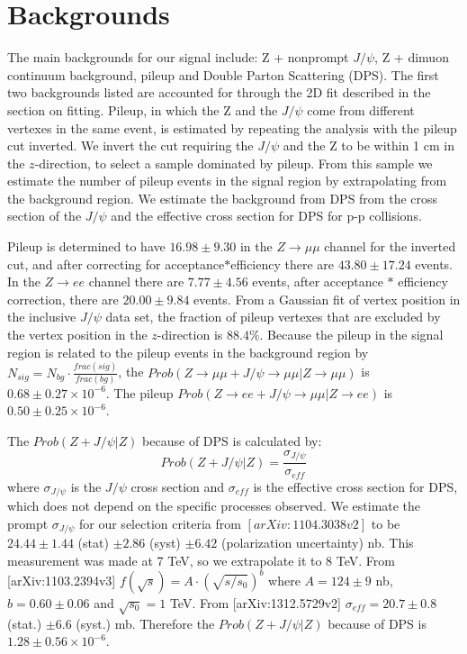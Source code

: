 \documentclass[a4paper,12pt]{article}
\begin{document}
\section{Backgrounds}
The main backgrounds for our signal include: Z + nonprompt $J\slash \psi$, Z + dimuon continuum background, pileup and Double Parton Scattering (DPS). The first two backgrounds listed are accounted for through the 2D fit described in the section on fitting. Pileup, in which the Z and the $J\slash \psi$ come from different vertexes in the same event, is estimated by repeating the analysis with the pileup cut inverted. We invert the cut requiring the $J\slash \psi$ and the Z to be within 1 \unit{cm} in the $z$-direction, to select a sample dominated by pileup. From this sample we estimate the number of pileup events in the signal region by extrapolating from the background region. We estimate the background from DPS from the cross section of the $J\slash \psi$ and the effective cross section for DPS for p-p collisions.

Pileup is determined to have $16.98 \pm 9.30$ in the $Z\rightarrow\mu\mu$ channel for the inverted cut, and after correcting for acceptance$\ast$efficiency there are $43.80 \pm 17.24$ events. In the $Z\rightarrow ee$ channel there are $7.77 \pm 4.56$ events, after acceptance $\ast$ efficiency correction, there are $20.00 \pm 9.84$ events. From a Gaussian fit of vertex position in the inclusive $J\slash \psi$ data set, the fraction of pileup vertexes that are excluded by the vertex position in the $z$-direction is $88.4\%$. Because the pileup in the signal region is related to the pileup events in the background region by $N_{sig} = N_{bg} \cdot \frac{frac(sig)}{frac(bg)}$, the $Prob(Z\rightarrow\mu\mu + J\slash \psi\rightarrow\mu\mu | Z\rightarrow\mu\mu)$ is $0.68 \pm 0.27 \times 10^{-6}$. The pileup $Prob(Z\rightarrow ee + J\slash \psi\rightarrow\mu\mu | Z\rightarrow ee)$ is $0.50 \pm 0.25 \times 10^{-6}$.

The $Prob(Z + J\slash \psi | Z)$ because of DPS is calculated by:
\begin{equation}
Prob(Z+J\slash\psi | Z) = \frac{\sigma_{J\slash\psi}}{\sigma_{eff}}
\end{equation}
where $\sigma_{J\slash\psi}$ is the $J\slash \psi$ cross section and $\sigma_{eff}$ is the effective cross section for DPS, which does not depend on the specific processes observed. We estimate the prompt $\sigma_{J\slash\psi}$ for our selection criteria from $[arXiv:1104.3038v2]$ to be $24.44 \pm 1.44$ (stat) $\pm 2.86$ (syst) $\pm 6.42$ (polarization uncertainty) \unit{nb}. This measurement was made at 7 \unit{TeV}, so we extrapolate it to 8 \unit{TeV}. From [arXiv:1103.2394v3] $f(\sqrt{s}) = A \cdot (\sqrt{s\slash s_{0}})^b$ where $A = 124 \pm 9 $ \unit{nb}, $b = 0.60 \pm 0.06$ and $\sqrt{s_0} = 1$ \unit{TeV}. From [arXiv:1312.5729v2] $\sigma_{eff} = 20.7 \pm 0.8$ (stat.) $\pm 6.6$ (syst.) \unit{mb}. Therefore the $Prob(Z + J\slash \psi | Z)$ because of DPS is $1.28 \pm 0.56 \times 10^{-6}$.
\end{document}
